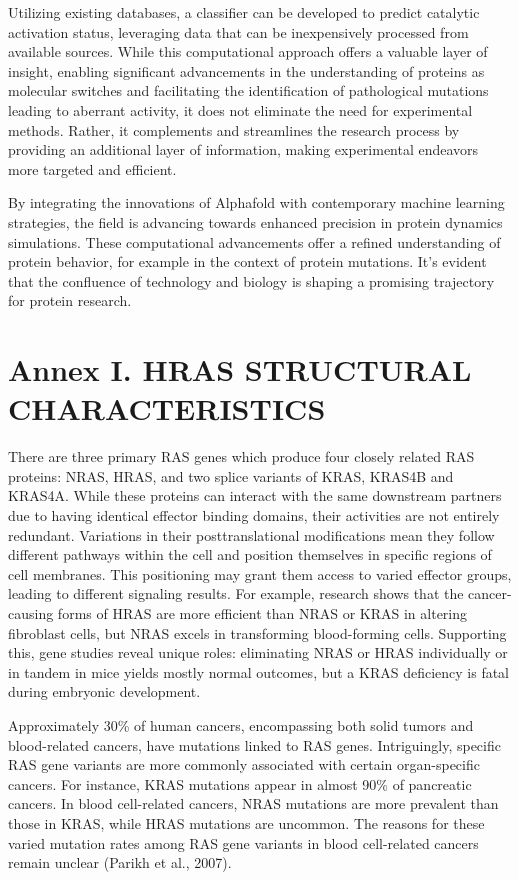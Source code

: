 \documentclass{article}
\begin{document}
Utilizing existing databases, a classifier can be developed to predict catalytic activation status, leveraging data that can be inexpensively processed from available sources. While this computational approach offers a valuable layer of insight, enabling significant advancements in the understanding of proteins as molecular switches and facilitating the identification of pathological mutations leading to aberrant activity, it does not eliminate the need for experimental methods. Rather, it complements and streamlines the research process by providing an additional layer of information, making experimental endeavors more targeted and efficient.

By integrating the innovations of Alphafold with contemporary machine learning strategies, the field is advancing towards enhanced precision in protein dynamics simulations. These computational advancements offer a refined understanding of protein behavior, for example in the context of protein mutations. It's evident that the confluence of technology and biology is shaping a promising trajectory for protein research.
\par
\section{Annex I. HRAS STRUCTURAL CHARACTERISTICS}

There are three primary RAS genes which produce four closely related RAS proteins: NRAS, HRAS, and two splice variants of KRAS, KRAS4B and KRAS4A. While these proteins can interact with the same downstream partners due to having identical effector binding domains, their activities are not entirely redundant. Variations in their posttranslational modifications mean they follow different pathways within the cell and position themselves in specific regions of cell membranes. This positioning may grant them access to varied effector groups, leading to different signaling results. For example, research shows that the cancer-causing forms of HRAS are more efficient than NRAS or KRAS in altering fibroblast cells, but NRAS excels in transforming blood-forming cells. Supporting this, gene studies reveal unique roles: eliminating NRAS or HRAS individually or in tandem in mice yields mostly normal outcomes, but a KRAS deficiency is fatal during embryonic development.

Approximately 30\% of human cancers, encompassing both solid tumors and blood-related cancers, have mutations linked to RAS genes. Intriguingly, specific RAS gene variants are more commonly associated with certain organ-specific cancers. For instance, KRAS mutations appear in almost 90\% of pancreatic cancers. In blood cell-related cancers, NRAS mutations are more prevalent than those in KRAS, while HRAS mutations are uncommon. The reasons for these varied mutation rates among RAS gene variants in blood cell-related cancers remain unclear (Parikh et al., 2007).
\end{document}
